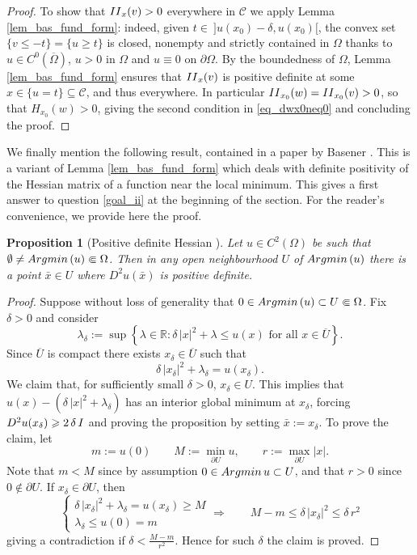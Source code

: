 \documentclass[12pt]{amsart}
\numberwithin{equation}{section}
\theoremstyle{plain}
\theoremstyle{plain}
\newtheorem{proposition}[theorem]{Proposition}
\theoremstyle{plain}
\theoremstyle{definition}
\newcommand{\R}{{\mathbb R}}
\renewcommand{\le}{\leqslant}
\renewcommand{\ge}{\geqslant}
\begin{document}
\begin{proof}
To show that ${\rm II}_{x}(v)>0$ everywhere in ${\mathcal C}$ we apply Lemma \ref{lem_bas_fund_form}: 
indeed, given $t\in \ ]u(x_0)-\delta, u(x_0)[$, the convex set $\{v\le -t\}=\{u\ge t\}$ is closed, nonempty and strictly contained in $\Omega$ thanks to $u\in C^0(\overline{\Omega})$, $u>0$ in $\Omega$ and $u\equiv 0$ on $\partial\Omega$. 
By the boundedness of $\Omega$, Lemma \ref{lem_bas_fund_form} ensures that ${\rm II}_{x}(v)$ is positive definite at some $x\in \{u=t\}\subseteq {\mathcal C}$, and thus everywhere.
In particular ${\rm II}_{x_0}(w)={\rm II}_{x_0}(v)>0$, so that $H_{x_0}(w)>0$, giving the second condition in \eqref{eq_dwx0neq0} and concluding the proof.
 \end{proof} 

We finally mention the following result, contained in a paper by Basener \cite{Bas76}. 
This is a variant of Lemma \ref{lem_bas_fund_form} which deals with definite positivity of the Hessian matrix of a function near the local minimum. 
This gives a first answer to question \eqref{goal_ii} at the beginning of the section.
For the reader's convenience, we provide here the proof. 

\begin{proposition}[Positive definite Hessian \cite{Bas76}]
\label{lem_basener}
Let $u\in C^2(\Omega)$ be such that $\emptyset\ne {\rm Argmin}\, (u)\Subset \Omega$. 
Then in any open neighbourhood $U$ of ${\rm Argmin}\, (u)$ there is a point $\bar{x}\in U$ where $D^2u(\bar{x})$ is positive definite.
\end{proposition}

\begin{proof}
Suppose without loss of generality that $0\in {\rm Argmin}\, (u)\subset U\Subset\Omega$. Fix $\delta>0$ and consider 
\[
 \lambda_\delta:=\sup\left\{\lambda \in \R: \delta\, |x|^2+\lambda\le u(x) \text{ for all $x\in \overline{U}$}\right\}.
\]
Since $\overline{U}$ is compact there exists $x_\delta\in \overline{U}$ such that 
\[
\delta\, |x_\delta|^2+\lambda_\delta=u(x_\delta).
\]
We claim that, for sufficiently small $\delta>0$, $x_\delta\in U$. 
This implies that $u(x)-(\delta\, |x|^2+\lambda_\delta)$ has an interior global minimum at $x_\delta$, forcing $D^2u(x_\delta)\ge 2\, \delta \, {\rm I}$ and proving the proposition by setting $\bar{x}:=x_{\delta}$. 
To prove the claim, let 
\[
m:=u(0)\qquad M:=\min_{\partial U} u,\qquad r:=\max_{\partial U}|x|.
\]
Note that $m<M$ since by assumption $0\in {\rm Argmin}\, u\subset U$, and that $r>0$ since $0\notin \partial U$.
If $x_\delta\in \partial U$, then 
\[
\begin{cases}
\delta\, |x_\delta|^2+\lambda_\delta=u(x_\delta)\ge M\\
 \lambda_\delta\le u(0)=m
\end{cases}
\Longrightarrow \qquad M-m\le \delta\, |x_\delta|^2\le \delta\, r^2
\]
giving a contradiction if $\delta<\frac{M-m}{r^2}$. Hence for such $\delta$ the claim is proved.
\end{proof}
\end{document}
